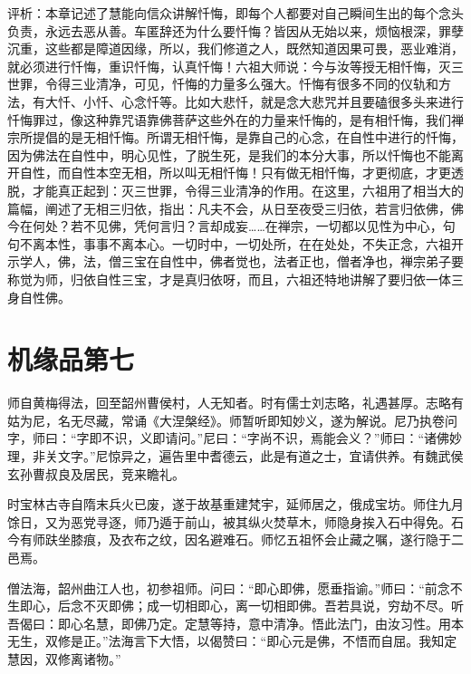 \documentclass[12pt,twoside,openany]{book}
\newcommand{\kai}[1]{{\CJKfamily{kai}#1}}
\begin{document}
\kai{评析：本章记述了慧能向信众讲解忏悔，即每个人都要对自己瞬间生出的每个念头负责，永远去恶从善。车匿辞还为什么要忏悔？皆因从无始以来，烦恼根深，罪孽沉重，这些都是障道因缘，所以，我们修道之人，既然知道因果可畏，恶业难消，就必须进行忏悔，重识忏悔，认真忏悔！六祖大师说：今与汝等授无相忏悔，灭三世罪，令得三业清净，可见，忏悔的力量多么强大。忏悔有很多不同的仪轨和方法，有大忏、小忏、心念忏等。比如大悲忏，就是念大悲咒并且要磕很多头来进行忏悔罪过，像这种靠咒语靠佛菩萨这些外在的力量来忏悔的，是有相忏悔，我们禅宗所提倡的是无相忏悔。所谓无相忏悔，是靠自己的心念，在自性中进行的忏悔，因为佛法在自性中，明心见性，了脱生死，是我们的本分大事，所以忏悔也不能离开自性，而自性本空无相，所以叫无相忏悔！只有做无相忏悔，才更彻底，才更透脱，才能真正起到：灭三世罪，令得三业清净的作用。在这里，六祖用了相当大的篇幅，阐述了无相三归依，指出：凡夫不会，从日至夜受三归依，若言归依佛，佛今在何处？若不见佛，凭何言归？言却成妄……在禅宗，一切都以见性为中心，句句不离本性，事事不离本心。一切时中，一切处所，在在处处，不失正念，六祖开示学人，佛，法，僧三宝在自性中，佛者觉也，法者正也，僧者净也，禅宗弟子要称觉为师，归依自性三宝，才是真归依呀，而且，六祖还特地讲解了要归依一体三身自性佛。}

\chapter{机缘品第七}
师自黄梅得法，回至韶州曹侯村，人无知者。时有儒士刘志略，礼遇甚厚。志略有姑为尼，名无尽藏，常诵《大涅槃经》。师暂听即知妙义，遂为解说。尼乃执卷问字，师曰：“字即不识，义即请问。”尼曰：“字尚不识，焉能会义？”师曰：“诸佛妙理，非关文字。”尼惊异之，遍告里中耆德云，此是有道之士，宜请供养。有魏武侯玄孙曹叔良及居民，竞来瞻礼。

时宝林古寺自隋末兵火已废，遂于故基重建梵宇，延师居之，俄成宝坊。师住九月馀日，又为恶党寻逐，师乃遁于前山，被其纵火焚草木，师隐身挨入石中得免。石今有师趺坐膝痕，及衣布之纹，因名避难石。师忆五祖怀会止藏之嘱，遂行隐于二邑焉。

僧法海，韶州曲江人也，初参祖师。问曰：“即心即佛，愿垂指谕。”师曰：“前念不生即心，后念不灭即佛；成一切相即心，离一切相即佛。吾若具说，穷劫不尽。听吾偈曰：即心名慧，即佛乃定。定慧等持，意中清净。悟此法门，由汝习性。用本无生，双修是正。”法海言下大悟，以偈赞曰：“即心元是佛，不悟而自屈。我知定慧因，双修离诸物。”
\end{document}
